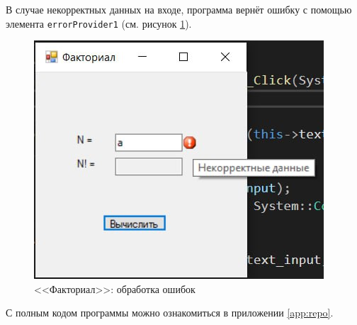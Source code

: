 \newpage
В случае некорректных данных на входе, программа вернёт ошибку с помощью элемента 
\verb|errorProvider1| (см. рисунок \ref{fig:factorial_error}).
\begin{figure}[H]
    \centering
    \includegraphics{../img/factorial/factorial_error.png}
    \caption{<<Факториал>>: обработка ошибок}
    \label{fig:factorial_error}
\end{figure}

С полным кодом программы можно ознакомиться в приложении \ref{app:repo}.
